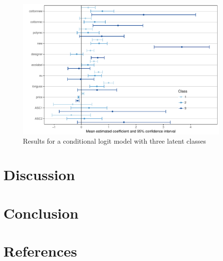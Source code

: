 \documentclass[review]{elsarticle}
\begin{document}






\begin{figure}[ht]
\begin{center}
 \includegraphics[width=0.95\textwidth]{figures/LatentClasses.pdf}
 \caption{Results for a conditional logit model with three latent classes}\label{fig:Habits}
 \end{center}
\end{figure}

\section{Discussion}\label{sec:discussion}

\section{Conclusion}\label{sec:conclusion}



\section*{References}


\end{document}
